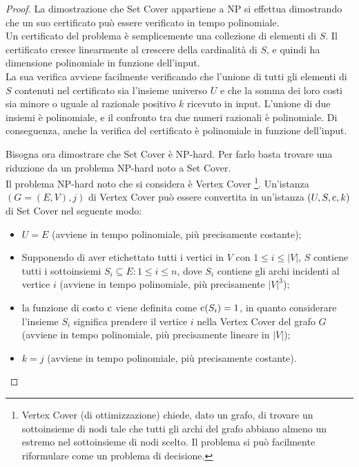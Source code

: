 \begin{proof}
    La dimostrazione che Set Cover appartiene a NP si effettua dimostrando che un suo certificato può essere verificato in tempo polinomiale.\\
    Un certificato del problema è semplicemente una collezione di elementi di $S$. Il certificato cresce linearmente al crescere della cardinalità di $S$, e quindi ha dimensione polinomiale in funzione dell'input.\\
    La sua verifica avviene facilmente verificando che l'unione di tutti gli elementi di $S$ contenuti nel certificato sia l'insieme universo $U$ e che la somma dei loro costi sia minore o uguale al razionale positivo $k$ ricevuto in input. L'unione di due insiemi è polinomiale, e il confronto tra due numeri razionali è polinomiale. Di conseguenza, anche la verifica del certificato è polinomiale in funzione dell'input.

    Bisogna ora dimostrare che Set Cover è NP-hard. Per farlo basta trovare una riduzione da un problema NP-hard noto a Set Cover.\\
    Il problema NP-hard noto che si considera è Vertex Cover \footnote{Vertex Cover (di ottimizzazione) chiede, dato un grafo, di trovare un sottoinsieme di nodi tale che tutti gli archi del grafo abbiano almeno un estremo nel sottoinsieme di nodi scelto. Il problema si può facilmente riformulare come un problema di decisione.}. Un'istanza $(G = (E,V), j)$ di Vertex Cover può essere convertita in un'istanza $(U, S, \textnormal{c}, k)$ di Set Cover nel seguente modo:
    \begin{itemize}
        \item $U=E$ (avviene in tempo polinomiale, più precisamente costante);
        \item Supponendo di aver etichettato tutti i vertici in $V$ con $1 \le i \le |V|$, $S$ contiene tutti i sottoinsiemi $S_i \subseteq E : 1 \le i \le n$, dove $S_i$ contiene gli archi incidenti al vertice $i$ (avviene in tempo polinomiale, più precisamente $|V|^3$);
        \item la funzione di costo $\textnormal{c}$ viene definita come $\textnormal{c}(S_i) = 1$, in quanto considerare l'insieme $S_i$ significa prendere il vertice $i$ nella Vertex Cover del grafo $G$ (avviene in tempo polinomiale, più precisamente lineare in $|V|$);
        \item $k = j$ (avviene in tempo polinomiale, più precisamente costante).
    \end{itemize}
    

\end{proof}
